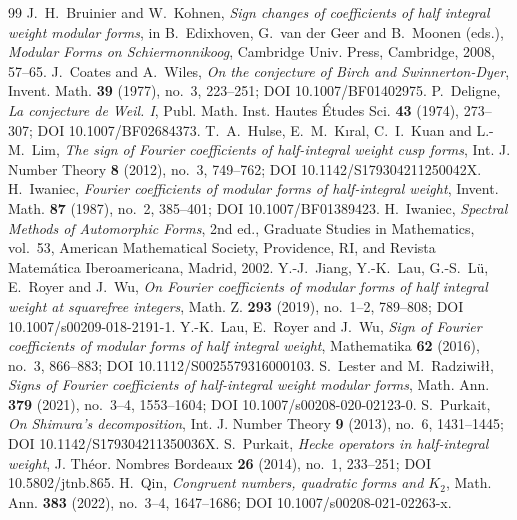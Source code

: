 \documentclass[10pt,a4paper]{amsart}
\begin{document}
\begin{thebibliography}{99}
 J.~H.~Bruinier and W.~Kohnen, \emph{Sign changes of coefficients of half integral weight modular forms}, in B.~Edixhoven, G.~van der Geer and B.~Moonen (eds.), \emph{Modular Forms on Schiermonnikoog}, Cambridge Univ. Press, Cambridge, 2008, 57--65.
 J.~Coates and A.~Wiles, \emph{On the conjecture of Birch and Swinnerton-Dyer}, Invent. Math. \textbf{39} (1977), no.~3, 223--251; DOI 10.1007/BF01402975.
 P.~Deligne, \emph{La conjecture de Weil. I}, Publ. Math. Inst. Hautes {\'E}tudes Sci. \textbf{43} (1974), 273--307; DOI 10.1007/BF02684373.
 T.~A.~Hulse, E.~M.~K{\i}ral, C.~I.~Kuan and L.-M.~Lim, \emph{The sign of Fourier coefficients of half-integral weight cusp forms}, Int. J. Number Theory \textbf{8} (2012), no.~3, 749--762; DOI 10.1142/S179304211250042X.
 H.~Iwaniec, \emph{Fourier coefficients of modular forms of half-integral weight}, Invent. Math. \textbf{87} (1987), no.~2, 385--401; DOI 10.1007/BF01389423.
 H.~Iwaniec, \emph{Spectral Methods of Automorphic Forms}, 2nd ed., Graduate Studies in Mathematics, vol.~53, American Mathematical Society, Providence, RI, and Revista Matem\'atica Iberoamericana, Madrid, 2002.
 Y.-J.~Jiang, Y.-K.~Lau, G.-S.~L{\"u}, E.~Royer and J.~Wu, \emph{On Fourier coefficients of modular forms of half integral weight at squarefree integers}, Math. Z. \textbf{293} (2019), no.~1--2, 789--808; DOI 10.1007/s00209-018-2191-1.
 Y.-K.~Lau, E.~Royer and J.~Wu, \emph{Sign of Fourier coefficients of modular forms of half integral weight}, Mathematika \textbf{62} (2016), no.~3, 866--883; DOI 10.1112/S0025579316000103.
 S.~Lester and M.~Radziwi{\l}{\l}, \emph{Signs of Fourier coefficients of half-integral weight modular forms}, Math. Ann. \textbf{379} (2021), no.~3--4, 1553--1604; DOI 10.1007/s00208-020-02123-0.
 S.~Purkait, \emph{On Shimura's decomposition}, Int. J. Number Theory \textbf{9} (2013), no.~6, 1431--1445; DOI 10.1142/S179304211350036X.
 S.~Purkait, \emph{Hecke operators in half-integral weight}, J. Th\'eor. Nombres Bordeaux \textbf{26} (2014), no.~1, 233--251; DOI 10.5802/jtnb.865.
 H.~Qin, \emph{Congruent numbers, quadratic forms and $K_2$}, Math. Ann. \textbf{383} (2022), no.~3--4, 1647--1686; DOI 10.1007/s00208-021-02263-x.

\end{thebibliography}
\end{document}
